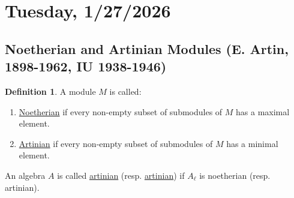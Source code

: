 \documentclass{article}
\theoremstyle{definition}
\newtheorem*{definition}{Definition}
\theoremstyle{plain}
\theoremstyle{remark}
\begin{document}
    \section*{Tuesday, 1/27/2026}
    
    \subsection*{Noetherian and Artinian Modules (E. Artin, 1898-1962, IU 1938-1946)}

    \begin{definition}
        A module \(M\) is called:

        \begin{enumerate}[label=\roman*)]
            \item \underline{Noetherian} if every non-empty subset of submodules of \(M\) has a maximal element.
            \item \underline{Artinian} if every non-empty subset of submodules of \(M\) has a minimal element. 
        \end{enumerate} 

        An algebra \(A\) is called \underline{artinian} (resp. \underline{artinian}) if \(A_\ell\) is noetherian (resp. artinian).
    \end{definition}
\end{document}
